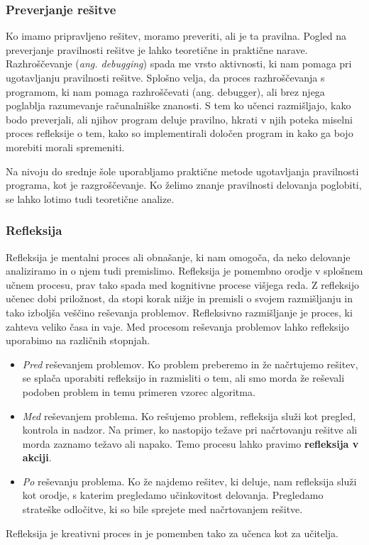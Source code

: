\subsubsection{Preverjanje rešitve}
\label{sec:preverjanje_rešitve}
Ko imamo pripravljeno rešitev, moramo preveriti, ali je ta
pravilna. Pogled na preverjanje pravilnosti rešitve je lahko
teoretične in praktične narave. Razhroščevanje (\emph{ang. debugging})
spada me vrsto aktivnosti, ki nam pomaga pri ugotavljanju pravilnosti
rešitve. Splošno velja, da proces razhroščevanja s programom, ki nam
pomaga razhroščevati (ang. debugger), ali brez njega poglablja
razumevanje računalniške znanosti. S tem ko učenci razmišljajo, kako
bodo preverjali, ali njihov program deluje pravilno, hkrati v njih
poteka miselni proces refleksije o tem, kako so implementirali določen
program in kako ga bojo morebiti morali spremeniti.

Na nivoju do srednje šole uporabljamo praktične metode ugotavljanja
pravilnosti programa, kot je razgroščevanje. Ko želimo znanje
pravilnosti delovanja poglobiti, se lahko lotimo tudi teoretične
analize.

\subsubsection{Refleksija}
\label{sec:refleksije}

Refleksija je mentalni proces ali obnašanje, ki nam omogoča, da neko
delovanje analiziramo in o njem tudi premislimo. Refleksija je
pomembno orodje v splošnem učnem procesu, prav tako spada med
kognitivne procese višjega reda. Z refleksijo učenec dobi priložnost,
da stopi korak nižje in premisli o svojem razmišljanju in tako
izboljša veščino reševanja problemov. Refleksivno razmišljanje je
proces, ki zahteva veliko časa in vaje. Med procesom reševanja
problemov lahko refleksijo uporabimo na različnih stopnjah.

\begin{itemize}
\tightlist
\item \emph{Pred} reševanjem problemov. Ko problem preberemo in že
  načrtujemo rešitev, se splača uporabiti refleksijo in razmisliti o
  tem, ali smo morda že reševali podoben problem in temu primeren
  vzorec algoritma.
\item \emph{Med} reševanjem problema. Ko rešujemo problem, refleksija
  služi kot pregled, kontrola in nadzor. Na primer, ko nastopijo
  težave pri načrtovanju rešitve ali morda zaznamo težavo ali
  napako. Temo procesu lahko pravimo \textbf{refleksija v akciji}.
\item \emph{Po} reševanju problema. Ko že najdemo rešitev, ki deluje,
  nam refleksija služi kot orodje, s katerim pregledamo učinkovitost
  delovanja. Pregledamo strateške odločitve, ki so bile sprejete med
   načrtovanjem rešitve.
\end{itemize}

Refleksija je kreativni proces in je pomemben tako za učenca kot za
učitelja.


